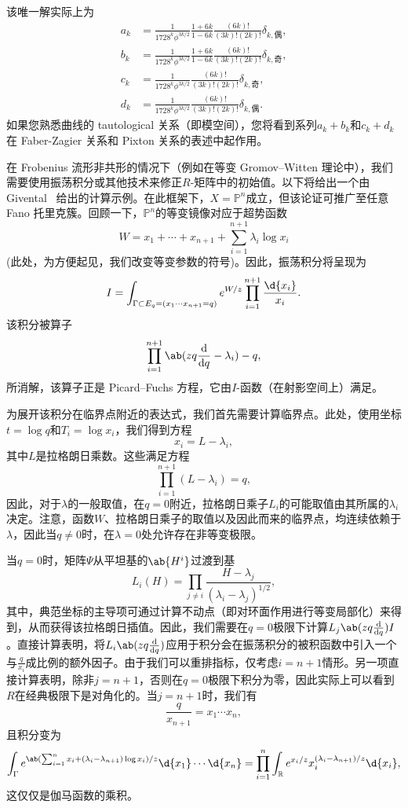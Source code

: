 \documentclass{amsart}
\theoremstyle{definition}
\theoremstyle{remark}
\theoremstyle{plain}
\theoremstyle{definition}
\theoremstyle{remark}
\newcommand{\R}{\mathbb{R}}
\renewcommand{\P}{\mathbb{P}}
\newcommand{\1}{\mathbf{1}}
\newcommand{\2}{\mathbf{2}}
\newcommand{\3}{\mathbf{3}}
\begin{document}
该唯一解实际上为
\begin{align*}
    a_k &= \frac{1}{1728^k \phi^{3k/2}} \frac{1+6k}{1-6k} \frac{(6k)!}{(3k)!(2k)!} \delta_{k, \text{偶}},  \\
    b_k &= \frac{1}{1728^k \phi^{3k/2}} \frac{1+6k}{1-6k}\frac{(6k)!}{(3k)!(2k)!} \delta_{k, \text{奇}},  \\
    c_k &= \frac{1}{1728^k \phi^{3k/2}}\frac{(6k)!}{(3k)!(2k)!} \delta_{k, \text{奇}}, \\
    d_k &= \frac{1}{1728^k \phi^{3k/2}} \frac{(6k)!}{(3k)!(2k)!} \delta_{k, \text{偶}}. 
\end{align*}
如果您熟悉曲线的 tautological 关系（即模空间），您将看到系列\(a_k + b_k\)和\(c_k + d_k\)在 Faber-Zagier 关系和 Pixton 关系的表述中起作用。

在 Frobenius 流形非共形的情况下（例如在等变 Gromov--Witten 理论中），我们需要使用振荡积分或其他技术来修正\(R\)-矩阵中的初始值。以下将给出一个由 Givental~\cite{Givental2001semisimple} 给出的计算示例。在此框架下，\(X = \P^n\)成立，但该论证可推广至任意 Fano 托里克簇。回顾一下，\(\P^n\)的等变镜像对应于超势函数
\[ W = x_1 + \cdots + x_{n+1} + \sum_{i=1}^{n+1} \lambda_i \log x_i \]
(此处，为方便起见，我们改变等变参数的符号)。因此，振荡积分将呈现为
\[ I = \int_{\Gamma \subset E_q = (x_1 \cdots x_{n+1}=q)} e^{W/z} \prod_{i=1}^{n+1} \frac{\d{x_i}}{x_i}. \]
该积分被算子
\[ \prod_{i=1}^{n+1}\ab(zq \odv{}{q} -\lambda_i) - q, \]
所消解，该算子正是 Picard--Fuchs 方程，它由\(I\)-函数（在射影空间上）满足。

为展开该积分在临界点附近的表达式，我们首先需要计算临界点。此处，使用坐标\(t = \log q\)和\(T_i = \log x_i\)，我们得到方程
\[ x_i = L - \lambda_i, \]
其中\(L\)是拉格朗日乘数。这些满足方程
\[ \prod_{i=1}^{n+1} (L - \lambda_i) = q, \]
因此，对于\(\lambda\)的一般取值，在\(q = 0\)附近，拉格朗日乘子\(L_i\)的可能取值由其所属的\(\lambda_i\)决定。注意，函数\(W\)、拉格朗日乘子的取值以及因此而来的临界点，均连续依赖于\(\lambda\)，因此当\(q \neq 0\)时，在\(\lambda = 0\)处允许存在非等变极限。

当\(q = 0\)时，矩阵\(\Psi\)从平坦基的\(\ab{H^i}\)过渡到基
\[ L_i(H) = \prod_{j \neq i} \frac{H - \lambda_j}{(\lambda_i - \lambda_j)^{1/2}}, \]
其中，典范坐标的主导项可通过计算不动点（即对环面作用进行等变局部化）来得到，从而获得该拉格朗日插值。因此，我们需要在\(q = 0\)极限下计算\(L_j \ab(z q \odv{}{q}) I\)。直接计算表明，将\(L_i \ab(z q \odv{}{q})\)应用于积分会在振荡积分的被积函数中引入一个与\(\frac{q}{x_i}\)成比例的额外因子。由于我们可以重排指标，仅考虑\(i = n+1\)情形。另一项直接计算表明，除非\( j = n+1\)，否则在\(q = 0\)极限下积分为零，因此实际上可以看到\(R\)在经典极限下是对角化的。当\(j = n+1\)时，我们有
\[ \frac{q}{x_{n+1}} = x_1 \cdots x_n, \]
且积分变为
\[ \int_{\Gamma} e^{\ab( \sum_{i=1}^n x_i + (\lambda_i - \lambda_{n+1})\log x_i ) / z} \d{x_1} \cdots \d{x_n} = \prod_{i=1}^n \int_{\R} e^{x_i/z} x_i^{(\lambda_i - \lambda_{n+1})/z} \d{x_i}, \]
这仅仅是伽马函数的乘积。
\end{document}
